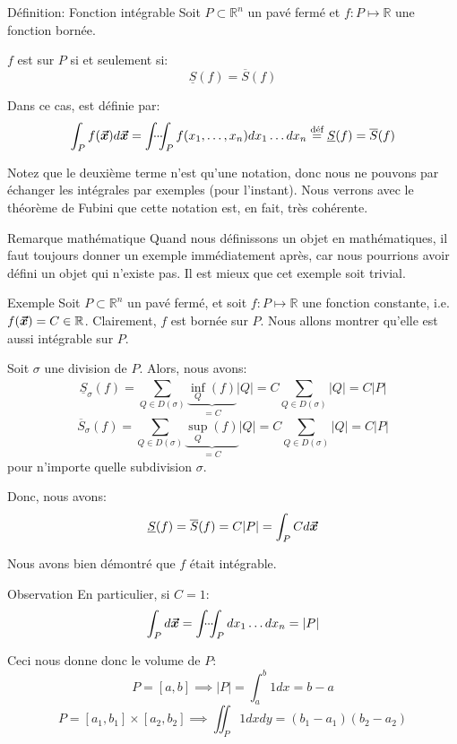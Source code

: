 \documentclass[a4paper]{article}
\begin{document}
\begin{parag}{Définition: Fonction intégrable}
    Soit $P \subset \mathbb{R}^n$ un pavé fermé et $f: P \mapsto \mathbb{R}$ une fonction bornée.

    $f$ est  sur $P$ si et seulement si: 
    \[\underline{S}\left(f\right) = \overline{S}\left(f\right)\]
    
    Dans ce cas,  est définie par: 
    \[\int_P f\left(\bvec{x}\right)d \bvec{x} = \idotsint_P f\left(x_1, \ldots, x_n\right) dx_1 \ldots dx_n \over{=}{déf} \underline{S}\left(f\right) = \overline{S}\left(f\right)\]
    
    Notez que le deuxième terme n'est qu'une notation, donc nous ne pouvons par échanger les intégrales par exemples (pour l'instant). Nous verrons avec le théorème de Fubini que cette notation est, en fait, très cohérente.

    \begin{subparag}{Remarque mathématique}
        Quand nous définissons un objet en mathématiques, il faut toujours donner un exemple immédiatement après, car nous pourrions avoir défini un objet qui n'existe pas. Il est mieux que cet exemple soit trivial.
    \end{subparag}
\end{parag}

\begin{parag}{Exemple}
    Soit $P \subset \mathbb{R}^n$ un pavé fermé, et soit $f: P\mapsto \mathbb{R}$ une fonction constante, i.e. $f\left(\bvec{x}\right) = C \in \mathbb{R}$. Clairement, $f$ est bornée sur $P$. Nous allons montrer qu'elle est aussi intégrable sur $P$.

    Soit $\sigma$ une division de $P$. Alors, nous avons: 
    \[\underline{S}_{\sigma}\left(f\right) = \sum_{Q \in D\left(\sigma\right)}^{} \underbrace{\inf_{Q}\left(f\right)}_{= C} \left|Q\right| = C \sum_{Q \in D\left(\sigma\right)}^{} \left|Q\right| = C\left|P\right|\]
    \[\overline{S}_{\sigma}\left(f\right) = \sum_{Q \in D\left(\sigma\right)}^{} \underbrace{\sup_{Q}\left(f\right)}_{= C} \left|Q\right| = C \sum_{Q \in D\left(\sigma\right)}^{} \left|Q\right| = C\left|P\right|\]
    pour n'importe quelle subdivision $\sigma$.
    
    Donc, nous avons: 
    \[\underline{S}\left(f\right) = \overline{S}\left(f\right) = C \left|P\right| = \int_{P} C d \bvec{x}\]
    
    Nous avons bien démontré que $f$ était intégrable.

    \begin{subparag}{Observation}
        En particulier, si $C = 1$: 
        \[\int_{P} d \bvec{x} = \idotsint_{P} dx_1 \ldots dx_n = \left|P\right|\]
        
        Ceci nous donne donc le volume de $P$: 
        \[P = \left[a, b\right] \implies \left|P\right| = \int_{a}^{b} 1 dx = b- a\]
        \[P = \left[a_1, b_1\right] \times\left[a_2, b_2\right] \implies \iint_{P} 1 dx dy = \left(b_1 - a_1\right)\left(b_2 - a_2\right)\]
    \end{subparag}
\end{parag}
\end{document}
